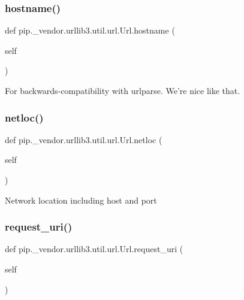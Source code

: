 \subsubsection{\texorpdfstring{hostname()}{hostname()}}
{\footnotesize\ttfamily def pip.\+\_\+vendor.\+urllib3.\+util.\+url.\+Url.\+hostname (\begin{DoxyParamCaption}\item[{}]{self }\end{DoxyParamCaption})}

\begin{DoxyVerb}For backwards-compatibility with urlparse. We're nice like that.\end{DoxyVerb}
 \mbox{\label{classpip_1_1__vendor_1_1urllib3_1_1util_1_1url_1_1Url_a7dc069fbbdfa58864a1f834446adf4df}} 
\subsubsection{\texorpdfstring{netloc()}{netloc()}}
{\footnotesize\ttfamily def pip.\+\_\+vendor.\+urllib3.\+util.\+url.\+Url.\+netloc (\begin{DoxyParamCaption}\item[{}]{self }\end{DoxyParamCaption})}

\begin{DoxyVerb}Network location including host and port\end{DoxyVerb}
 \mbox{\label{classpip_1_1__vendor_1_1urllib3_1_1util_1_1url_1_1Url_a55d7eb61b1f1188f3c852b6c63625b4a}} 
\subsubsection{\texorpdfstring{request\+\_\+uri()}{request\_uri()}}
{\footnotesize\ttfamily def pip.\+\_\+vendor.\+urllib3.\+util.\+url.\+Url.\+request\+\_\+uri (\begin{DoxyParamCaption}\item[{}]{self }\end{DoxyParamCaption})}

